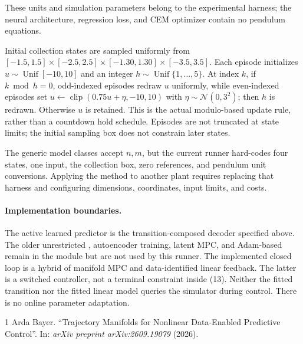 \documentclass[11pt]{article}
\newcommand{\clip}{\operatorname{clip}}
\newcommand{\code}[1]{\texttt{\detokenize{#1}}}
\begin{document}
These units and simulation parameters belong to the experimental harness; the neural architecture, regression loss, and CEM optimizer contain no pendulum equations.

Initial collection states are sampled uniformly from $[-1.5,1.5]\times[-2.5,2.5]\times[-1.30,1.30]\times[-3.5,3.5]$. Each episode initializes $u\sim\operatorname{Unif}[-10,10]$ and an integer $h\sim\operatorname{Unif}\{1,\ldots,5\}$. At index $k$, if $k\bmod h=0$, odd-indexed episodes redraw $u$ uniformly, while even-indexed episodes set $u\leftarrow\clip(0.75u+\eta,-10,10)$ with $\eta\sim\mathcal N(0,3^2)$; then $h$ is redrawn. Otherwise $u$ is retained. This is the actual modulo-based update rule, rather than a countdown hold schedule. Episodes are not truncated at state limits; the initial sampling box does not constrain later states.

The generic model classes accept $n,m$, but the current runner hard-codes four states, one input, the collection box, zero references, and pendulum unit conversions. Applying the method to another plant requires replacing that harness and configuring dimensions, coordinates, input limits, and costs.

\paragraph{Implementation boundaries.}
The active learned predictor is the transition-composed decoder specified above. The older unrestricted \code{BehaviorDecoder}, autoencoder training, latent MPC, and Adam-based \code{DataDrivenMPCSolver} remain in the module but are not used by this runner. The implemented closed loop is a hybrid of manifold MPC and data-identified linear feedback. The latter is a switched controller, not a terminal constraint inside (13). Neither the fitted transition nor the fitted linear model queries the simulator during control. There is no online parameter adaptation.

\begin{thebibliography}{1}
 Arda Bayer. ``Trajectory Manifolds for Nonlinear Data-Enabled Predictive Control''. In: \emph{arXiv preprint arXiv:2609.19079} (2026).
\end{thebibliography}
\end{document}
